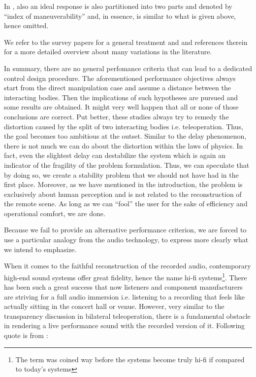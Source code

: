 In \cite{yokokohjiyoshikawa}, also an ideal response is also partitioned into two parts and denoted by \enquote{index of 
maneuverability} and, in essence, is similar to what is given above, hence omitted. 

We refer to the survey papers \cite{hokayemspong,passenberg} for a general treatment and \cite{klomp,dennis} and references 
therein for a more detailed overview about many variations in the literature.


In summary, there are no general perfomance criteria that can lead to a dedicated control design procedure. The aforementioned 
performance objectives always start from the direct manipulation case and assume a distance between the interacting bodies.
Then the implications of such hypotheses are pursued and some results are obtained. It might very well happen that all or none 
of those conclusions are correct. Put better, these studies always try to remedy the distortion caused by the split of two 
interacting bodies i.e. teleoperation. Thus, the goal becomes too ambitious at the outset. Similar to the delay phenomenon, 
there is not much we can do about the distortion within the laws of physics. In fact, even the slightest delay can destabilize 
the system which is again an indicator of the fragility of the problem formulation. 
Thus, we can speculate that by doing so, we create a stability problem that we should not have had in the first place. Moreover, 
as we have mentioned in the introduction, the problem is exclusively about human perception and is not related to the reconstruction 
of the remote scene. As long as we can \enquote{fool} the user for the sake of efficiency and operational comfort, we are done. 

Because we fail to provide an alternative performance criterion, we are forced to use a particular analogy from the audio
technology, to express more clearly what we intend to emphasize. 

When it comes to the faithful reconstruction of the recorded audio, contemporary high-end sound systems offer great fidelity, hence 
the name hi-fi systems\footnote{The term was coined way before the systems become truly hi-fi if compared to today's systems}. There has 
been such a great success that now listeners and component manufacturers are striving for a full audio immersion i.e. listening to 
a recording that feels like actually sitting in the concert hall or venue. However, very similar to the transparency discussion 
in bilateral teleoperation, there is a fundamental obstacle in rendering a live performance sound with the recorded version of it. 
Following quote is from \cite{atkinson}:

